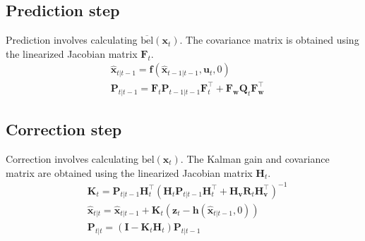 \documentclass[10pt]{article}
\begin{document}
	\subsection{Prediction step}
	 Prediction involves calculating $\overline{\text{bel}}(\mathbf{x}_{t})$. The covariance matrix is obtained using the linearized Jacobian matrix $\mathbf{F}_{t}$.
	\begin{equation}
		\boxed{  \begin{aligned}
				& \hat{\mathbf{x}}_{t|t-1} = \mathbf{f}(\hat{\mathbf{x}}_{t-1|t-1}, \mathbf{u}_{t} , 0 ) \\
				& \mathbf{P}_{t|t-1} = \mathbf{F}_{t}\mathbf{P}_{t-1|t-1}\mathbf{F}_{t}^{\intercal} + \mathbf{F}_{\mathbf{w}}\mathbf{Q}_{t} \mathbf{F}_{\mathbf{w}}^{\intercal}
		\end{aligned} }
	\end{equation}
	
	\subsection{Correction step}
 Correction involves calculating $\text{bel}(\mathbf{x}_{t})$. The Kalman gain and covariance matrix are obtained using the linearized Jacobian matrix $\mathbf{H}_{t}$.
	\begin{equation} \label{eq:ekf3}
		\boxed{ \begin{aligned}
				&     \mathbf{K}_{t} = \mathbf{P}_{t|t-1}\mathbf{H}_{t}^{\intercal}(\mathbf{H}_{t}\mathbf{P}_{t|t-1}\mathbf{H}_{t}^{\intercal} + \mathbf{H}_{\mathbf{v}}\mathbf{R}_{t} \mathbf{H}_{\mathbf{v}}^{\intercal} )^{-1} \\
				& \hat{\mathbf{x}}_{t|t}  = \hat{\mathbf{x}}_{t|t-1} + \mathbf{K}_{t}( \mathbf{z}_{t} - \mathbf{h}(\hat{\mathbf{x}}_{t|t-1}, 0)) \\
				&     \mathbf{P}_{t|t}    = (\mathbf{I} - \mathbf{K}_{t}\mathbf{H}_{t})\mathbf{P}_{t|t-1}
		\end{aligned} } 
	\end{equation}
	
\end{document}
